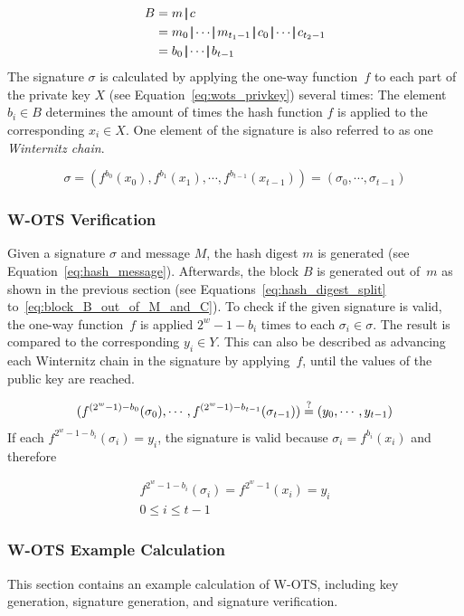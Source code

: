 \begin{align}
\label{eq:block_B_out_of_M_and_C}
B &= m \concat c  \\ 
&= m_0 \concat \cdots \concat m_{t_1 - 1} \concat c_0 \concat \cdots \concat c_{t_2 - 1} \nonumber \\
&= b_0 \concat \cdots \concat b_{t-1} \nonumber
\end{align}
The signature $\sigma$ is calculated by applying the one-way function~$f$ to each part of the private key $X$ (see Equation~\ref{eq:wots_privkey}) several times: The element $b_i \in B$ determines the amount of times the hash function $f$ is applied to the corresponding $x_i \in X$. One element of the signature is also referred to as one \textit{Winternitz chain}.

\begin{equation}
\sigma = (f^{b_0}(x_0), f^{b_1}(x_1), \cdots, f^{b_{t-1}}(x_{t-1})) = (\sigma_0, \cdots, \sigma_{t-1})
\end{equation}

\subsubsection{W-OTS Verification}
\label{cha:wots-verification}
Given a signature $\sigma$ and message $M$, the hash digest $m$ is generated (see Equation~\ref{eq:hash_message}). Afterwards, the block $B$ is generated out of~$m$ as shown in the previous section (see Equations~\ref{eq:hash_digest_split} to~\ref{eq:block_B_out_of_M_and_C}). To check if the given signature is valid, the one-way function~$f$ is applied $2^w - 1 - b_i$ times to each $\sigma_i \in \sigma$. The result is compared to the corresponding $y_i \in Y$. This can also be described as advancing each Winternitz chain in the signature by applying~$f$, until the  values of the public key are reached.

\begin{equation}
(f^{(2^w-1)-b_0}(\sigma_0), \cdots, f^{(2^w - 1) - b_{t-1}}(\sigma_{t-1})) \stackrel{?}{=} (y_0, \cdots, y_{t-1})
\end{equation}
If each $f^{2^w-1-b_i}(\sigma_i) = y_i$, the signature is valid because $\sigma_i = f^{b_i}(x_i)$ and therefore

\begin{gather}
f^{2^w-1-b_i}(\sigma_i) = f^{2^w-1}(x_i) = y_i \\
0 \leq i \leq t-1 \nonumber
\end{gather}

\subsubsection{W-OTS Example Calculation}
\label{sec:w-ots_example_calc}
This section contains an example calculation of W-OTS, including key generation, signature generation, and signature verification.

